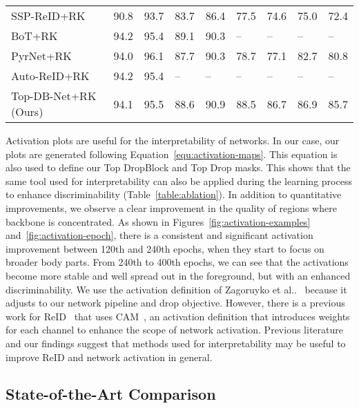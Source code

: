 \documentclass[a4paper,conference]{IEEEtran}
\makeatletter
\DeclareRobustCommand\onedot{\futurelet\@let@token\@onedot}
\def\@onedot{\ifx\@let@token.\else.\null\fi\xspace}
\def\etal{et al\onedot}
\makeatother
\begin{document}
\begin{table*}[!htb]
\begin{tabular}{lllllllll}
  \midrule
  SSP-ReID+RK~\cite{quispe2019improved}    & 90.8     & 93.7     & 83.7     & 86.4     & 77.5     & 74.6     & 75.0     & 72.4     \\
  BoT+RK~\cite{luo2019bag}                 & 94.2 & 95.4     & 89.1 & 90.3 &  --      &  --      &  --      &  --      \\
  PyrNet+RK~\cite{martinel2019aggregating} & 94.0     & 96.1 & 87.7     & 90.3 & 78.7 & 77.1 & 82.7 & 80.8 \\
  Auto-ReID+RK~\cite{quan2019auto}         & 94.2 & 95.4     &  --      &  --      &  --      &  --      &  --      &  --      \\
  Top-DB-Net+RK (Ours)                     & 94.1 & 95.5 & 88.6 & 90.9 & 88.5 & 86.7 & 86.9 & 85.7 \\
  
  \bottomrule
  \end{tabular}
\end{table*}

Activation plots are useful for the interpretability of networks. In our case, our plots are generated following Equation~\ref{equ:activation-maps}. This equation is also used to define our Top DropBlock and Top Drop masks. This shows that the same tool used for interpretability can also be applied during the learning process to enhance discriminability (Table~\ref{table:ablation}). In addition to quantitative improvements, we observe a clear improvement in the quality of regions where backbone is concentrated. As shown in Figures~\ref{fig:activation-examples} and~\ref{fig:activation-epoch}, there is a consistent and significant activation improvement between 120th and 240th epochs, when they start to focus on broader body parts. From 240th to 400th epochs, we can see that the activations become more stable and well spread out in the foreground, but with an enhanced discriminability. We use the activation definition of Zagoruyko \etal~\cite{zagoruyko2016paying} because it adjusts to our network pipeline and drop objective. However, there is a previous work for ReID~\cite{yang2019towards} that uses CAM~\cite{zhou2016learning}, an activation definition that introduces weights for each channel to enhance the scope of network activation. Previous literature and our findings suggest that methods used for interpretability may be useful to improve ReID and network activation in general.
 
\subsection{State-of-the-Art Comparison}
 
\end{document}
